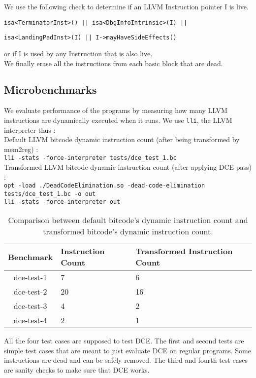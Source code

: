 We use the following check to determine if an LLVM Instruction pointer I is live.

\texttt{isa<TerminatorInst>() || isa<DbgInfoIntrinsic>(I) ||}

\texttt{isa<LandingPadInst>(I) || I->mayHaveSideEffects()}

or if I is used by any Instruction that is also live.\\

We finally erase all the instructions from each basic block that are dead.

\subsection{Microbenchmarks}

We evaluate performance of the programs by measuring how many LLVM instructions are dynamically executed when it runs.
We use \texttt{lli}, the LLVM interpreter thus :\\

Default LLVM bitcode dynamic instruction count (after being transformed by mem2reg) :\\

\texttt{lli -stats -force-interpreter tests/dce\_test\_1.bc}\\

Transformed LLVM bitcode dynamic instruction count (after applying DCE pass) :\\

\texttt{opt -load ./DeadCodeElimination.so -dead-code-elimination  tests/dce\_test\_1.bc -o out}\\

\texttt{lli -stats -force-interpreter out}\\

\begin{table}[!ht]
\centering
\begin{tabular}{c|l|l}
  \toprule
  \textbf{Benchmark} & \textbf{Instruction Count} & \textbf{Transformed Instruction Count} \\
  \midrule
  dce-test-1 & 7  & 6  \\ 
  dce-test-2 & 20 & 16 \\
  dce-test-3 & 4  & 2  \\
  dce-test-4 & 2  & 1  \\
  \bottomrule
\end{tabular}
\caption{Comparison between default bitcode's dynamic instruction count and transformed
  bitcode's dynamic instruction count.}
\end{table}  

All the four test cases are supposed to test DCE.
The first and second tests are simple test cases that are meant to just evaluate DCE
on regular programs.
Some instructions are dead and can be safely removed.
The third and fourth test cases are sanity checks to make sure that DCE works.

\newpage

